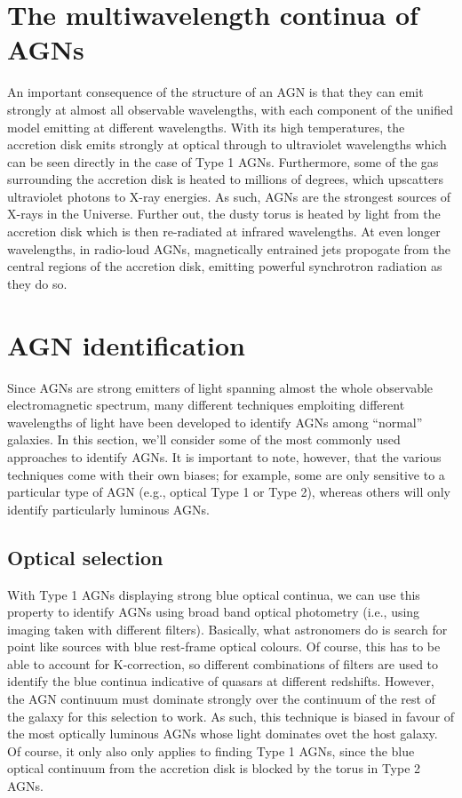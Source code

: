 \documentclass[11pt]{article}
\begin{document}
\section{The multiwavelength continua of AGNs}
An important consequence of the structure of an AGN is that they can
emit strongly at almost all observable wavelengths, with each
component of the unified model emitting at different wavelengths. With
its high temperatures, the accretion disk emits strongly at optical
through to ultraviolet wavelengths which can be seen directly in the
case of Type 1 AGNs. Furthermore, some of the gas surrounding the
accretion disk is heated to millions of degrees, which upscatters
ultraviolet photons to X-ray energies. As such, AGNs are the strongest
sources of X-rays in the Universe. Further out, the dusty torus is
heated by light from the accretion disk which is then re-radiated at
infrared wavelengths. At even longer wavelengths, in radio-loud AGNs,
magnetically entrained jets propogate from the central regions of the
accretion disk, emitting powerful synchrotron radiation as they do so.

\section{AGN identification}
Since AGNs are strong emitters of light spanning almost the whole
observable electromagnetic spectrum, many different techniques
emploiting different wavelengths of light have been developed to
identify AGNs among ``normal'' galaxies. In this section, we'll
consider some of the most commonly used approaches to identify
AGNs. It is important to note, however, that the various techniques
come with their own biases; for example, some are only sensitive to a
particular type of AGN (e.g., optical Type 1 or Type 2), whereas
others will only identify particularly luminous AGNs.

\subsection{Optical selection}
With Type 1 AGNs displaying strong blue optical continua, we can use
this property to identify AGNs using broad band optical photometry
(i.e., using imaging taken with different filters). Basically, what
astronomers do is search for point like sources with blue rest-frame
optical colours. Of course, this has to be able to account for
K-correction, so different combinations of filters are used to
identify the blue continua indicative of quasars at different
redshifts. However, the AGN continuum must dominate strongly over the
continuum of the rest of the galaxy for this selection to work. As
such, this technique is biased in favour of the most optically
luminous AGNs whose light dominates ovet the host galaxy. Of course,
it only also only applies to finding Type 1 AGNs, since the blue
optical continuum from the accretion disk is blocked by the torus in
Type 2 AGNs.
\end{document}
